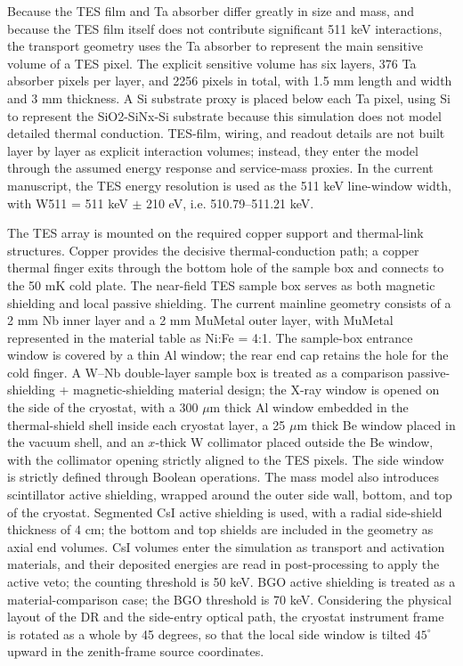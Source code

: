 \documentclass[pdflatex,sn-mathphys-num]{sn-jnl}
\begin{document}
Because the TES film and Ta absorber differ greatly in size and mass, and because the TES film itself does not contribute significant 511 keV interactions, the transport geometry uses the Ta absorber to represent the main sensitive volume of a TES pixel. The explicit sensitive volume has six layers, 376 Ta absorber pixels per layer, and 2256 pixels in total, with 1.5 mm length and width and 3 mm thickness. A Si substrate proxy is placed below each Ta pixel, using Si to represent the SiO2-SiNx-Si substrate because this simulation does not model detailed thermal conduction. TES-film, wiring, and readout details are not built layer by layer as explicit interaction volumes; instead, they enter the model through the assumed energy response and service-mass proxies. In the current manuscript, the TES energy resolution is used as the 511 keV line-window width, with W511 = 511 keV $\pm$ 210 eV, i.e. 510.79--511.21 keV.

The TES array is mounted on the required copper support and thermal-link structures. Copper provides the decisive thermal-conduction path; a copper thermal finger exits through the bottom hole of the sample box and connects to the 50 mK cold plate. The near-field TES sample box serves as both magnetic shielding and local passive shielding. The current mainline geometry consists of a 2 mm Nb inner layer and a 2 mm MuMetal outer layer, with MuMetal represented in the material table as Ni:Fe = 4:1. The sample-box entrance window is covered by a thin Al window; the rear end cap retains the hole for the cold finger. A W--Nb double-layer sample box is treated as a comparison passive-shielding + magnetic-shielding material design; the X-ray window is opened on the side of the cryostat, with a 300 $\mu$m thick Al window embedded in the thermal-shield shell inside each cryostat layer, a 25 $\mu$m thick Be window placed in the vacuum shell, and an $x$-thick W collimator placed outside the Be window, with the collimator opening strictly aligned to the TES pixels. The side window is strictly defined through Boolean operations. The mass model also introduces scintillator active shielding, wrapped around the outer side wall, bottom, and top of the cryostat. Segmented CsI active shielding is used, with a radial side-shield thickness of 4 cm; the bottom and top shields are included in the geometry as axial end volumes. CsI volumes enter the simulation as transport and activation materials, and their deposited energies are read in post-processing to apply the active veto; the counting threshold is 50 keV. BGO active shielding is treated as a material-comparison case; the BGO threshold is 70 keV. Considering the physical layout of the DR and the side-entry optical path, the cryostat instrument frame is rotated as a whole by 45 degrees, so that the local side window is tilted $45^\circ$ upward in the zenith-frame source coordinates.
\end{document}
